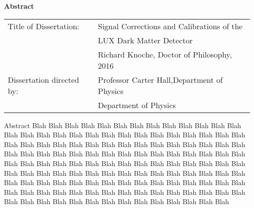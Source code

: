 \thispagestyle{plain}
\begin{center}
    \Large
    \textbf{Abstract}
    
    \vspace{0.4cm}
    \large
    \begin{tabular}{ll}
  	Title of Dissertation:& Signal Corrections and Calibrations of the \\
  	& LUX Dark Matter Detector \\
  	& Richard Knoche, Doctor of Philosophy, 2016 \\
    Dissertation directed by:& Professor Carter Hall,Department of Physics \\
    & Department of Physics
 	\end{tabular}

	\vspace{1cm}
    \normalsize
    Abstract Blah Blah Blah Blah Blah Blah Blah Blah Blah Blah Blah Blah Blah Blah Blah Blah Blah Blah Blah Blah Blah Blah Blah Blah Blah Blah Blah Blah Blah Blah Blah Blah Blah Blah Blah Blah Blah Blah Blah Blah Blah Blah Blah Blah Blah Blah Blah Blah Blah Blah Blah Blah Blah Blah Blah Blah Blah Blah Blah Blah Blah Blah Blah Blah Blah Blah Blah Blah Blah Blah Blah Blah Blah Blah Blah Blah Blah Blah Blah Blah Blah Blah Blah Blah Blah Blah Blah Blah Blah Blah Blah Blah Blah Blah Blah Blah Blah Blah Blah Blah Blah Blah Blah Blah Blah Blah Blah Blah Blah Blah Blah Blah Blah Blah Blah Blah Blah Blah Blah Blah Blah Blah Blah Blah Blah Blah Blah Blah Blah Blah Blah Blah
    
    
\end{center}